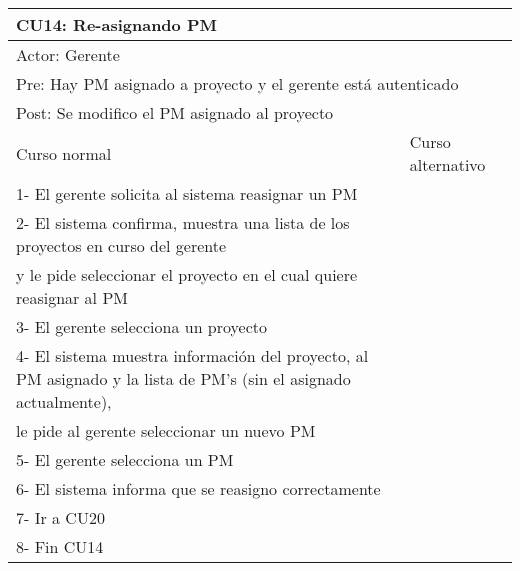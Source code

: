\begin{table}[H]
  \begin{adjustbox}{max width = \textwidth}
  \begin{tabular}{|l|l|}
    \hline
    \multicolumn{2}{|l|}{CU14: Re-asignando PM} \\\hline
    \multicolumn{2}{|l|}{Actor: Gerente} \\\hline
    \multicolumn{2}{|l|}{Pre: Hay PM asignado a proyecto y el gerente está autenticado} \\\hline
    \multicolumn{2}{|l|}{Post: Se modifico el PM asignado al proyecto} \\\hline
     Curso normal & Curso alternativo\\ \hline
	 1- El gerente solicita al sistema reasignar un PM & \\ \hline
	 2- El sistema confirma, muestra una lista de los proyectos en curso del gerente \\ y le pide seleccionar el proyecto en el cual quiere reasignar al PM & \\ \hline
	 3- El gerente selecciona un proyecto & \\ \hline
     4- El sistema muestra información del proyecto, al PM asignado y la lista de PM's (sin el asignado actualmente), \\ le pide al gerente seleccionar un nuevo PM & \\ \hline
     5- El gerente selecciona un PM & \\ \hline
	 6- El sistema informa que se reasigno correctamente & \\ \hline
   7- Ir a CU20 & \\ \hline
     8- Fin CU14 & \\ \hline
  \end{tabular}
  \end{adjustbox}
\end{table}


